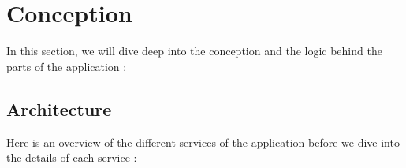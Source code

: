 \newpage
\section{Conception}
In this section, we will dive deep into the conception and the logic behind the parts of the application :
\subsection{Architecture}
Here is an overview of the different services of the application before we dive into the details of each service :
\linebreak
{}
